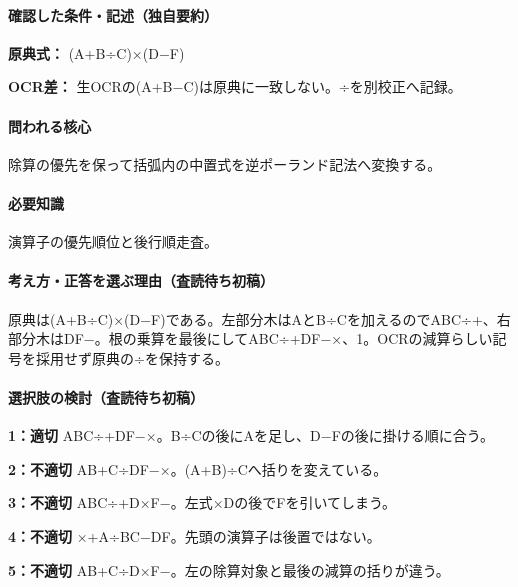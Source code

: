 \paragraph{確認した条件・記述（独自要約）}\mbox{}\par

\noindent\textbf{原典式：} (A+B÷C)×(D−F)\par

\noindent\textbf{OCR差：} 生OCRの(A+B−C)は原典に一致しない。÷を別校正へ記録。\par

\paragraph{問われる核心} 除算の優先を保って括弧内の中置式を逆ポーランド記法へ変換する。

\paragraph{必要知識} 演算子の優先順位と後行順走査。

\paragraph{考え方・正答を選ぶ理由（査読待ち初稿）} 原典は(A+B÷C)×(D−F)である。左部分木はAとB÷Cを加えるのでABC÷+、右部分木はDF−。根の乗算を最後にしてABC÷+DF−×、1。OCRの減算らしい記号を採用せず原典の÷を保持する。

\paragraph{選択肢の検討（査読待ち初稿）}\mbox{}\par

\noindent\textbf{1：適切} ABC÷+DF−×。B÷Cの後にAを足し、D−Fの後に掛ける順に合う。\par

\noindent\textbf{2：不適切} AB+C÷DF−×。(A+B)÷Cへ括りを変えている。\par

\noindent\textbf{3：不適切} ABC÷+D×F−。左式×Dの後でFを引いてしまう。\par

\noindent\textbf{4：不適切} ×+A÷BC−DF。先頭の演算子は後置ではない。\par

\noindent\textbf{5：不適切} AB+C÷D×F−。左の除算対象と最後の減算の括りが違う。\par

